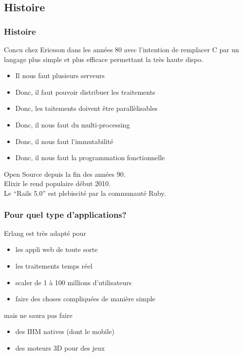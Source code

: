 \documentclass[notes=only]{beamer}
\begin{document}
\begin{frame}
  \subsection[Histoire]{Histoire}
  \frametitle{Histoire}

  Concu chez Ericsson dans les années 80 avec l'intention de remplacer
  C par un langage plus simple et plus efficace permettant la très haute
  dispo.

  \begin{itemize}
  \item Il nous faut plusieurs serveurs
  \item Donc, il faut pouvoir distribuer les traitements
  \item Donc, les taitements doivent être parallèlisables
  \item Donc, il nous faut du multi-processing
  \item Donc, il nous faut l'immutabilité
  \item Donc, il nous faut la programmation fonctionnelle
  \end{itemize}

  Open Source depuis la fin des années 90.\\
  Elixir le rend populaire début 2010.\\
  Le ``Rails 5.0'' est plebiscité par la communauté
  Ruby.


\end{frame}

\begin{frame}
  \frametitle{Pour quel type d'applications?}
  Erlang est très adapté pour
  \begin{itemize}
  \item les appli web de toute sorte
  \item les traitements temps réel
  \item scaler de 1 à 100 millions d'utilisateurs
  \item faire des choses compliquées de manière simple
  \end{itemize}
  mais ne saura pas faire
  \begin{itemize}
  \item des IHM natives (dont le mobile)
  \item des moteurs 3D pour des jeux
  \end{itemize}
\end{frame}
\end{document}
